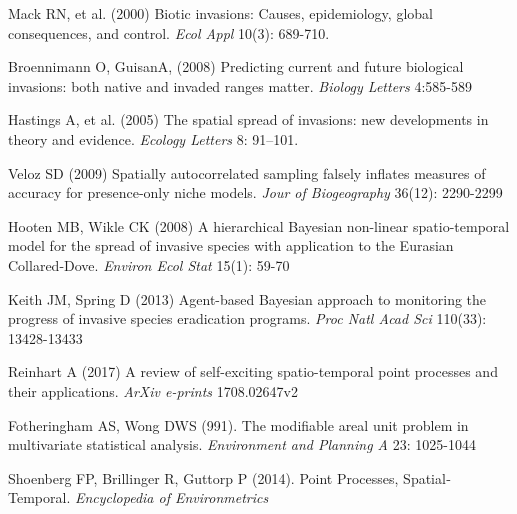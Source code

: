 \documentclass[11pt,a4paper]{article}
\begin{document}
\begin{thebibliography}{99}

 Mack RN, et al. (2000) Biotic invasions: Causes, epidemiology, global consequences, and control. \textit{Ecol Appl} 10(3): 689-710.


 Broennimann O, GuisanA, (2008) Predicting current and future biological invasions: both native and invaded ranges matter. \textit{Biology Letters} 4:585-589

 Hastings A, et al. (2005) The spatial spread of invasions: new developments in theory and evidence. \textit{Ecology Letters} 8: 91–101.

 Veloz SD (2009) Spatially autocorrelated sampling falsely inflates measures of accuracy for presence‐only niche models. \textit{Jour of Biogeography} 36(12): 2290-2299

 Hooten MB, Wikle CK (2008) A hierarchical Bayesian non-linear spatio-temporal model for the spread of invasive species with application to the Eurasian Collared-Dove. \textit{Environ Ecol Stat} 15(1): 59-70


 Keith JM, Spring D (2013) Agent-based Bayesian approach to monitoring the progress of invasive species eradication programs. \textit{Proc Natl Acad Sci} 110(33): 13428-13433


 Reinhart A (2017) A review of self-exciting spatio-temporal point processes and their applications. \textit{ArXiv e-prints} 1708.02647v2

 Fotheringham AS, Wong DWS (991). The modifiable areal unit problem in multivariate statistical analysis. \textit{Environment and Planning A} 23: 1025-1044

 Shoenberg FP, Brillinger R, Guttorp P (2014). Point Processes, Spatial‐Temporal. \textit{Encyclopedia of Environmetrics}


\end{thebibliography}
\end{document}
